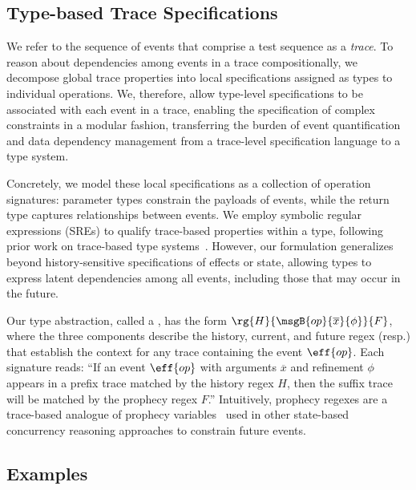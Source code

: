 \subsection{Type-based Trace Specifications}

We refer to the sequence of events that comprise a test sequence as a
\emph{trace}.  To reason about dependencies among events in a trace
compositionally, we decompose global trace properties into local
specifications assigned as types to individual operations.  We,
therefore, allow type-level specifications to be associated with each
event in a trace, enabling the specification of complex constraints in
a modular fashion, transferring the burden of event quantification and
data dependency management from a trace-level specification language
to a type system.

Concretely, we model these local specifications as a collection of
operation signatures: parameter types constrain the payloads of
events, while the return type captures relationships between
events. We employ symbolic regular expressions (SREs) to qualify
trace-based properties within a type, following prior work on
trace-based type systems~\cite{KT+14,ZYDJ24,NUKT+18}. However, our
formulation generalizes beyond history-sensitive specifications of
effects or state, allowing types to express latent dependencies among
all events, including those that may occur in the future.

Our type abstraction, called a \tyName, has the form
$\rg{H}{\msgB{op}{\overline{x}}{\phi}}{F}$, where the three components
describe the history, current, and future regex (resp.) that establish
the context for any trace containing the event $\eff{op}$. Each
signature reads: ``If an event $\eff{op}$ with arguments
$\overline{x}$ and refinement $\phi$ appears in a prefix trace matched
by the history regex $H$, then the suffix trace will be matched by the
prophecy regex $F$.'' Intuitively, prophecy regexes are a trace-based
analogue of prophecy variables~\cite{LM22} used in other state-based
concurrency reasoning approaches to constrain future events.

\subsection{Examples}

